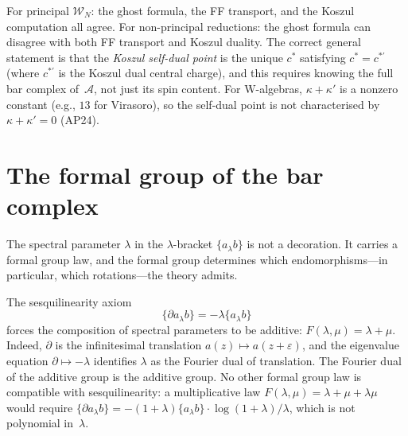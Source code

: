 \documentclass[11pt]{article}
\newcommand{\cA}{\mathcal{A}}
\newcommand{\cW}{\mathcal{W}}
\begin{document}
\begin{observation}
\label{obs:non-principal-frontier}
For principal $\cW_N$: the ghost formula, the FF transport, and
the Koszul computation all agree.  For non-principal reductions:
the ghost formula can disagree with both FF transport and Koszul
duality.  The correct general statement is that the
\emph{Koszul self-dual point} is the unique $c^*$ satisfying
$c^* = c^{*\prime}$ (where $c^{*\prime}$ is the Koszul dual
central charge), and this requires knowing the
full bar complex of~$\cA$, not just its spin content.
For W-algebras, $\kappa + \kappa'$ is a nonzero
constant (e.g., $13$ for Virasoro), so the self-dual point
is not characterised by $\kappa + \kappa' = 0$ (AP24).
\end{observation}

\section{The formal group of the bar complex}
\label{sec:formal-group-bar}

The spectral parameter $\lambda$ in the $\lambda$-bracket
$\{a_\lambda b\}$ is not a decoration.  It carries a formal group
law, and the formal group determines which endomorphisms---in
particular, which rotations---the theory admits.

\begin{observation}
\label{obs:sesquilinearity-additive}
The sesquilinearity axiom
\[
\{\partial a_\lambda b\} = -\lambda\{a_\lambda b\}
\]
forces the composition of spectral parameters to be additive:
$F(\lambda, \mu) = \lambda + \mu$.  Indeed, $\partial$ is the
infinitesimal translation $a(z) \mapsto a(z+\varepsilon)$, and the
eigenvalue equation $\partial \mapsto -\lambda$ identifies $\lambda$
as the Fourier dual of translation.  The Fourier dual of the
additive group is the additive group.  No other formal group law is
compatible with sesquilinearity: a multiplicative law
$F(\lambda,\mu) = \lambda + \mu + \lambda\mu$ would require
$\{\partial a_\lambda b\} = -(1+\lambda)\{a_\lambda b\} \cdot
\log(1+\lambda)/\lambda$, which is not polynomial in~$\lambda$.
\end{observation}
\end{document}
